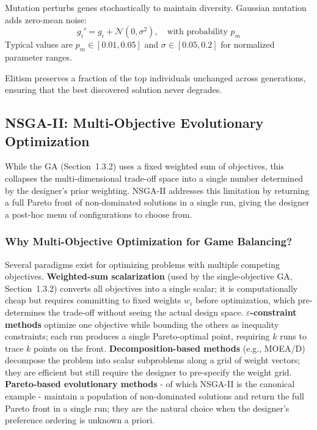 Mutation perturbs genes stochastically to maintain diversity. Gaussian mutation adds zero-mean noise:
\begin{equation}
g_i' = g_i + \mathcal{N}(0, \sigma^2), \quad \text{with probability } p_m
\label{eq:gaussian_mutation}
\end{equation}
Typical values are $p_m \in [0.01, 0.05]$ and $\sigma \in [0.05, 0.2]$ for normalized parameter ranges.

Elitism preserves a fraction of the top individuals unchanged across generations, ensuring that the best discovered solution never degrades.

\subsection{NSGA-II: Multi-Objective Evolutionary Optimization}

While the GA (Section~1.3.2) uses a fixed weighted sum of objectives, this collapses the multi-dimensional trade-off space into a single number determined by the designer's prior weighting. NSGA-II addresses this limitation by returning a full Pareto front of non-dominated solutions in a single run, giving the designer a post-hoc menu of configurations to choose from.

\subsubsection{Why Multi-Objective Optimization for Game Balancing?}

Several paradigms exist for optimizing problems with multiple competing objectives. \textbf{Weighted-sum scalarization} (used by the single-objective GA, Section~1.3.2) converts all objectives into a single scalar; it is computationally cheap but requires committing to fixed weights $w_i$ before optimization, which pre-determines the trade-off without seeing the actual design space. \textbf{$\varepsilon$-constraint methods} optimize one objective while bounding the others as inequality constraints; each run produces a single Pareto-optimal point, requiring $k$ runs to trace $k$ points on the front. \textbf{Decomposition-based methods} (e.g., MOEA/D) decompose the problem into scalar subproblems along a grid of weight vectors; they are efficient but still require the designer to pre-specify the weight grid. \textbf{Pareto-based evolutionary methods} - of which NSGA-II is the canonical example - maintain a population of non-dominated solutions and return the full Pareto front in a single run; they are the natural choice when the designer's preference ordering is unknown a priori.

